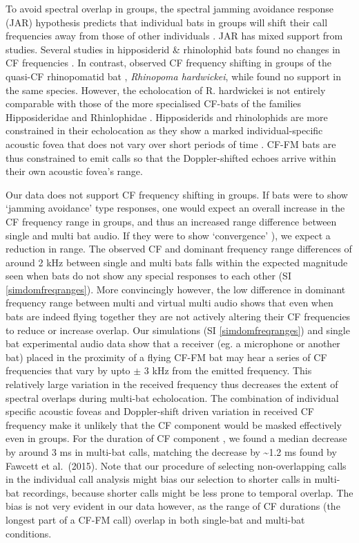 \documentclass[
]{book}
\begin{document}
To avoid spectral overlap in groups, the spectral jamming avoidance response (JAR) hypothesis predicts that individual bats in groups will shift their call frequencies away from those of other individuals \citep{ulanovsky2004dynamics}. JAR has mixed support from studies. Several studies in hipposiderid \& rhinolophid bats found no changes in CF frequencies \citep{jones1993echolocation, jones1994individual, fawcett2015clutter, pye1972bimodal}. In contrast, \citet{habersetzer1981adaptive} observed CF frequency shifting in groups of the quasi-CF rhinopomatid bat , \emph{Rhinopoma hardwickei}, while \citet{cvikel2015b} found no support in the same species. However, the echolocation of R. hardwickei is not entirely comparable with those of the more specialised CF-bats of the families Hipposideridae and Rhinlophidae \citep{simmons1984echolocation}. Hipposiderids and rhinolophids are more constrained in their echolocation as they show a marked individual-specific acoustic fovea that does not vary over short periods of time \citep{neuweiler2000biology, schnitzler1976peripheral}. CF-FM bats are thus constrained to emit calls so that the Doppler-shifted echoes arrive within their own acoustic fovea's range.

Our data does not support CF frequency shifting in groups. If bats were to show `jamming avoidance' type responses, one would expect an overall increase in the CF frequency range in groups, and thus an increased range difference between single and multi bat audio. If they were to show `convergence' ), we expect a reduction in range. The observed CF and dominant frequency range differences of around 2 kHz between single and multi bats falls within the expected magnitude seen when bats do not show any special responses to each other (SI \ref{simdomfreqranges}). More convincingly however, the low difference in dominant frequency range between multi and virtual multi audio shows that even when bats are indeed flying together they are not actively altering their CF frequencies to reduce or increase overlap. Our simulations (SI \ref{simdomfreqranges}) and single bat experimental audio data show that a receiver (eg. a microphone or another bat) placed in the proximity of a flying CF-FM bat may hear a series of CF frequencies that vary by upto \(\pm\) 3 kHz from the emitted frequency. This relatively large variation in the received frequency thus decreases the extent of spectral overlaps during multi-bat echolocation. The combination of individual specific acoustic foveas and Doppler-shift driven variation in received CF frequency make it unlikely that the CF component would be masked effectively even in groups. For the duration of CF component , we found a median decrease by around 3 ms in multi-bat calls, matching the decrease by \textasciitilde1.2 ms found by Fawcett et al.~(2015). Note that our procedure of selecting non-overlapping calls in the individual call analysis might bias our selection to shorter calls in multi-bat recordings, because shorter calls might be less prone to temporal overlap. The bias is not very evident in our data however, as the range of CF durations (the longest part of a CF-FM call) overlap in both single-bat and multi-bat conditions.
\end{document}
